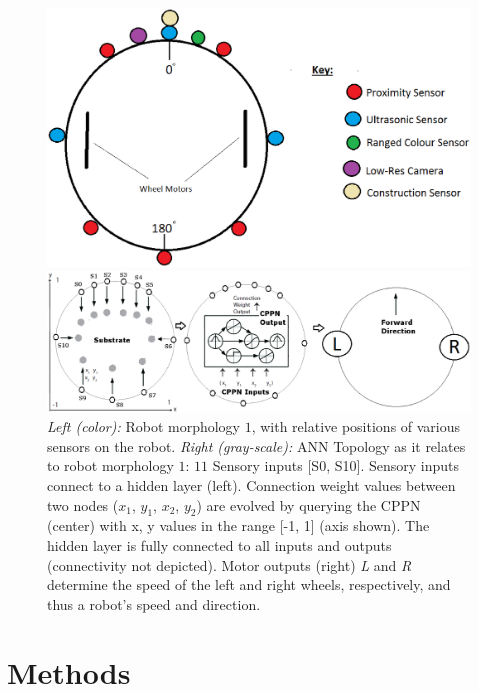 \documentclass[conference]{IEEEtran}
\begin{document}
\begin{figure}[t]
    \centering
    \begin{minipage}{0.39\textwidth}
       	\centering
        \includegraphics[width=\textwidth]{Morphology.eps}
    \end{minipage}
    \centering
    \begin{minipage}{0.60\textwidth}
       	\centering
        \includegraphics[width=\textwidth]{ANN_Config3.eps}
    \end{minipage}
    \caption{\textit{Left (color):} Robot morphology $1$, with relative positions of various sensors on the robot.
    \textit{Right (gray-scale):} ANN Topology as it relates to robot morphology $1$: $11$ Sensory inputs [S0, S10].  Sensory inputs connect to a hidden
    layer (left).  Connection weight values between two nodes ($x_{1}$, $y_{1}$, $x_{2}$, $y_{2}$) are evolved by querying the CPPN (center) with x, y
    values in the range [-1, 1] (axis shown).  The hidden layer is fully connected to all inputs and outputs (connectivity not depicted).
    Motor outputs (right)
    \textit{L} and \textit{R} determine the speed of the left and right wheels, respectively, and thus a robot's speed and direction.}\label{fig:ann}
\end{figure}

\section{Methods}
\end{document}
